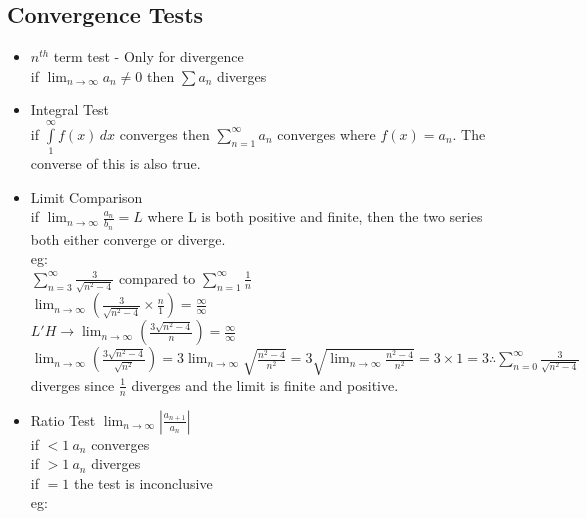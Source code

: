 \documentclass{article}
\begin{document}
  \subsection*{\color{BrickRed}Convergence Tests}
  \begin{itemize}
    \item $n^{th}$ term test - Only for divergence\\
      \subitem if \( \lim_{n\rightarrow\infty}a_n\neq0 \) then \( \sum
      a_n\) diverges\\
    \item Integral Test\\
      \subitem if \( \int\limits_{1}^{\infty} f(x) \, dx \) converges
      then \( \sum\limits_{n=1}^{\infty} a_n\) converges where \(
      f(x)=a_n\). The converse of this is also true.\\
    \item Limit Comparison\\
      \subitem if \( \lim_{n\rightarrow\infty} \frac{a_n}{b_n} = L \)
      where L is both positive and finite, then the two series
      both either converge or diverge.\\
      \subitem eg:\\
      \( \sum\limits_{n=3}^{\infty} \frac{3}{\sqrt{n^2-4}} \)
      compared to 
      \( \sum\limits_{n=1}^{\infty}\frac{1}{n} \)\\
      \( \lim_{n\rightarrow\infty}\left( \frac{3}{\sqrt{n^2-4}}
      \times \frac{n}{1} \right)=\frac{\infty}{\infty}\)\\
      \(L'H \rightarrow \lim_{n\rightarrow\infty}\left(
      \frac{3\sqrt{n^2-4}}{n} \right)=\frac{\infty}{\infty}\)\\
      \(\lim_{n\rightarrow\infty}\left(
      \frac{3\sqrt{n^2-4}}{\sqrt{n^2}} \right) =
      3\lim_{n\rightarrow\infty}\sqrt{\frac{n^2-4}{n^2}} =
      3\sqrt{\lim_{n\rightarrow\infty}\frac{n^2-4}{n^2}} =
      3 \times 1 = 3 \therefore \sum\limits_{n=0}^{\infty}
      \frac{3}{\sqrt{n^2-4}}\) diverges since \( \frac{1}{n} \)
      diverges and the limit is finite and positive.\\
    \item Ratio Test
      \subitem \(\lim_{n\rightarrow\infty}\left|
      \frac{a_{n+1}}{a_n} \right|\)\\
      if \(<1 ~ a_n\) converges\\
      if \(>1 ~ a_n\) diverges\\
      if \(=1\) the test is inconclusive\\
      \subitem eg:\\

\end{itemize}
\end{document}
